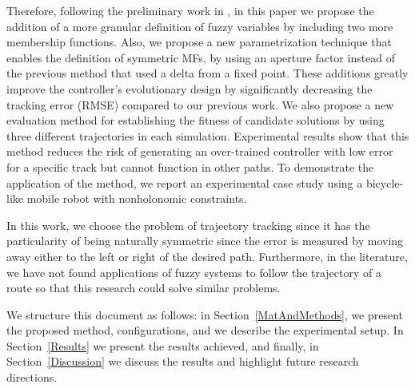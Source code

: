 \documentclass[symmetry,article,submit,moreauthors,pdftex]{Definitions/mdpi}
\begin{document}
Therefore, following the preliminary work in
\cite{mancilla2022tracking,Mancilla2021}, in this paper we propose the
addition of a more granular definition of fuzzy variables by including two more
membership functions. Also, we propose a new parametrization technique that
enables the definition of symmetric MFs, by using an aperture factor instead of
the previous method that used a delta from a fixed point.  These additions
greatly improve the controller's evolutionary design by significantly
decreasing the tracking error (RMSE) compared to our previous work. We also
propose a new evaluation method for establishing the fitness of candidate
solutions by using three different trajectories in each simulation.
Experimental results show that this method reduces the risk of generating an
over-trained controller with low error for a specific track but cannot function
in other paths. To demonstrate the application of the method, we report an
experimental case study using a bicycle-like mobile robot with nonholonomic
constraints. 

In this work, we choose the problem of trajectory tracking since it has the
particularity of being naturally symmetric since the error is measured by
moving away either to the left or right of the desired path. Furthermore, in
the literature, we have not found applications of fuzzy systems to follow the
trajectory of a route so that this research could solve similar problems.

We structure this document as follows: in Section~\ref{MatAndMethods}, we
present the proposed method, configurations, and we describe the experimental
setup. In Section~\ref{Results} we present the results achieved, and finally,
in Section~\ref{Discussion} we discuss the results and highlight future
research directions.

 
\end{document}
